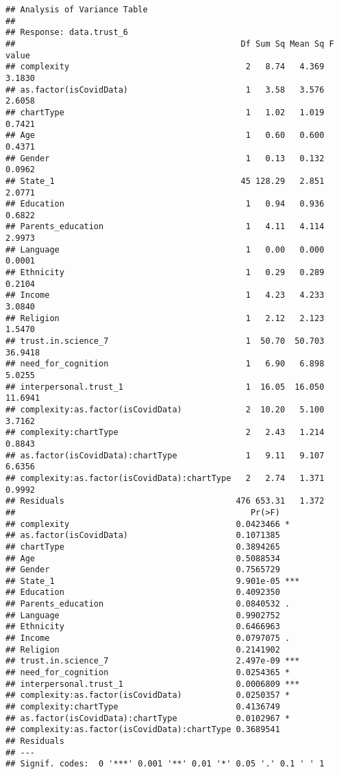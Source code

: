 \documentclass[
]{article}
\begin{document}
\begin{verbatim}
## Analysis of Variance Table
## 
## Response: data.trust_6
##                                              Df Sum Sq Mean Sq F value
## complexity                                    2   8.74   4.369  3.1830
## as.factor(isCovidData)                        1   3.58   3.576  2.6058
## chartType                                     1   1.02   1.019  0.7421
## Age                                           1   0.60   0.600  0.4371
## Gender                                        1   0.13   0.132  0.0962
## State_1                                      45 128.29   2.851  2.0771
## Education                                     1   0.94   0.936  0.6822
## Parents_education                             1   4.11   4.114  2.9973
## Language                                      1   0.00   0.000  0.0001
## Ethnicity                                     1   0.29   0.289  0.2104
## Income                                        1   4.23   4.233  3.0840
## Religion                                      1   2.12   2.123  1.5470
## trust.in.science_7                            1  50.70  50.703 36.9418
## need_for_cognition                            1   6.90   6.898  5.0255
## interpersonal.trust_1                         1  16.05  16.050 11.6941
## complexity:as.factor(isCovidData)             2  10.20   5.100  3.7162
## complexity:chartType                          2   2.43   1.214  0.8843
## as.factor(isCovidData):chartType              1   9.11   9.107  6.6356
## complexity:as.factor(isCovidData):chartType   2   2.74   1.371  0.9992
## Residuals                                   476 653.31   1.372        
##                                                Pr(>F)    
## complexity                                  0.0423466 *  
## as.factor(isCovidData)                      0.1071385    
## chartType                                   0.3894265    
## Age                                         0.5088534    
## Gender                                      0.7565729    
## State_1                                     9.901e-05 ***
## Education                                   0.4092350    
## Parents_education                           0.0840532 .  
## Language                                    0.9902752    
## Ethnicity                                   0.6466963    
## Income                                      0.0797075 .  
## Religion                                    0.2141902    
## trust.in.science_7                          2.497e-09 ***
## need_for_cognition                          0.0254365 *  
## interpersonal.trust_1                       0.0006809 ***
## complexity:as.factor(isCovidData)           0.0250357 *  
## complexity:chartType                        0.4136749    
## as.factor(isCovidData):chartType            0.0102967 *  
## complexity:as.factor(isCovidData):chartType 0.3689541    
## Residuals                                                
## ---
## Signif. codes:  0 '***' 0.001 '**' 0.01 '*' 0.05 '.' 0.1 ' ' 1
\end{verbatim}
\end{document}

